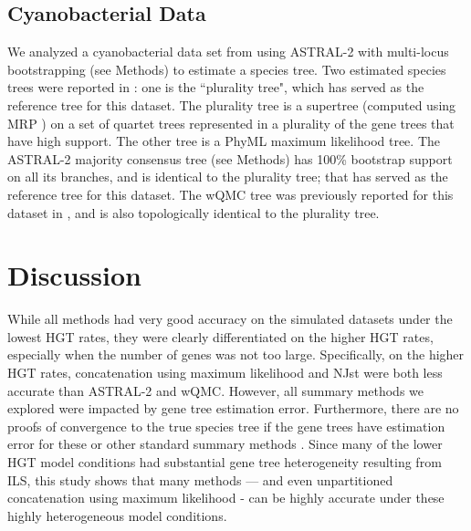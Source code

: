 \subsection{Cyanobacterial Data}

We analyzed a cyanobacterial data set from \cite{Cyanobacteria} using ASTRAL-2 with multi-locus bootstrapping (see Methods) to 
estimate a species tree.   
Two estimated species trees were
reported in \cite{Cyanobacteria}: one is the
``plurality tree", which has served
as the reference tree for this dataset.
The plurality tree is a supertree (computed using
MRP \cite{baum_mrp_2004}) on a set of
quartet trees represented in a plurality of 
the gene trees that have high support. 
The other tree is a PhyML \cite{PhyML} maximum likelihood
tree. 
The ASTRAL-2 majority consensus tree (see Methods) 
has 100\% bootstrap support on all its branches, and is 
identical to the plurality tree; 
that has served as the reference tree for this dataset.
The wQMC tree was previously reported for this dataset in \cite{wQMC}, and is
also topologically  identical to the plurality tree. 



\section{Discussion}  
While all methods  had very good accuracy on
the simulated datasets under the 
lowest HGT rates, they were clearly differentiated on the higher HGT rates,
especially when the number of genes was not too large. 
Specifically, on the higher HGT rates, concatenation using 
maximum likelihood and NJst were both less
accurate than ASTRAL-2 and wQMC. 
However, all summary methods we explored were impacted
by gene tree estimation error. Furthermore,   there are no proofs
of convergence to the true species tree if the gene
trees have estimation error for these or other
standard summary methods \cite{roch2015robustness,WarnowCurrents2015}.
Since many of the lower HGT model conditions
had substantial gene tree heterogeneity resulting from ILS,
this study shows that many methods — and even unpartitioned concatenation  using
maximum likelihood - can be highly accurate under these highly heterogeneous 
model conditions. 

